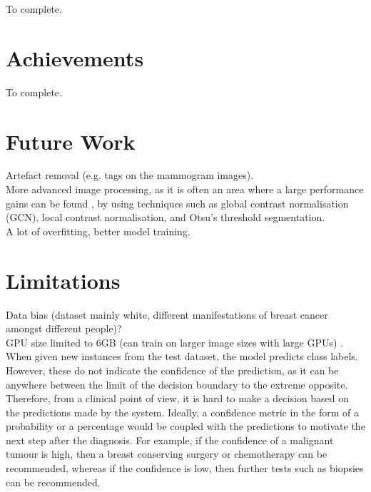 To complete.


\section{Achievements}

To complete.
    

\section{Future Work}

Artefact removal (e.g. tags on the mammogram images).\\

More advanced image processing, as it is often an area where a large performance gains can be found \citep{Litjens2017}, by using techniques such as global contrast normalisation (GCN), local contrast normalisation, and Otsu’s threshold segmentation.\\

A lot of overfitting, better model training.


\section{Limitations}
\label{sec:conclusions-limitations}

Data bias (dataset mainly white, different manifestations of breast cancer amongst different people)?\\

GPU size limited to 6GB (can  train on larger image sizes with large GPUs) \citep{Shen2017}.\\

When given new instances from the test dataset, the model predicts class labels. However, these do not indicate the confidence of the prediction, as it can be anywhere between the limit of  the decision boundary to the extreme opposite. Therefore, from a clinical point of view, it is hard to make a decision based on the  predictions made by the system. Ideally, a confidence metric in the form of a probability or a percentage would be coupled with the predictions  to  motivate the next  step after the diagnosis. For example, if the confidence of  a malignant tumour is high,  then a breast conserving surgery or chemotherapy can be recommended, whereas if the confidence is low, then further tests such as biopsies  can be recommended. %
    
